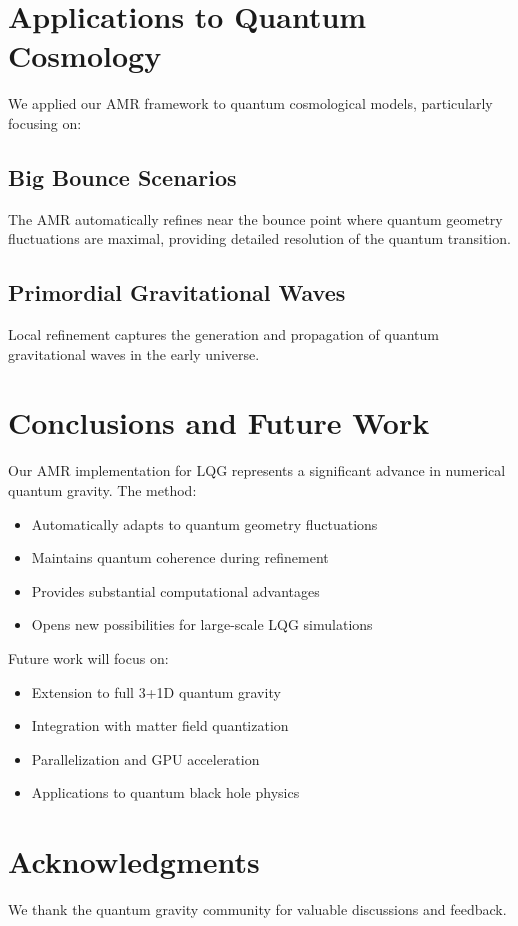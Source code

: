 \documentclass[11pt]{article}
\begin{document}
\section{Applications to Quantum Cosmology}

We applied our AMR framework to quantum cosmological models, particularly focusing on:

\subsection{Big Bounce Scenarios}
The AMR automatically refines near the bounce point where quantum geometry fluctuations are maximal, providing detailed resolution of the quantum transition.

\subsection{Primordial Gravitational Waves}
Local refinement captures the generation and propagation of quantum gravitational waves in the early universe.

\section{Conclusions and Future Work}

Our AMR implementation for LQG represents a significant advance in numerical quantum gravity. The method:
\begin{itemize}
\item Automatically adapts to quantum geometry fluctuations
\item Maintains quantum coherence during refinement
\item Provides substantial computational advantages
\item Opens new possibilities for large-scale LQG simulations
\end{itemize}

Future work will focus on:
\begin{itemize}
\item Extension to full 3+1D quantum gravity
\item Integration with matter field quantization
\item Parallelization and GPU acceleration
\item Applications to quantum black hole physics
\end{itemize}

\section*{Acknowledgments}

We thank the quantum gravity community for valuable discussions and feedback.



\end{document}
